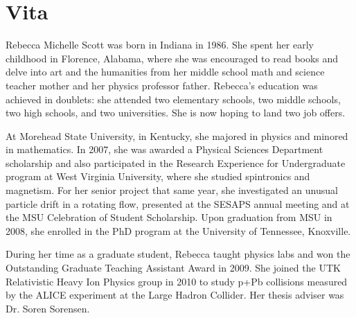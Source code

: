 \chapter*{Vita} \label{ch:vita}

%
%

Rebecca Michelle Scott was born in Indiana in 1986. She spent her early childhood in Florence, Alabama, where she was encouraged to read books and delve into art and the humanities from her middle school math and science teacher mother and her physics professor father. Rebecca's education was achieved in doublets: she attended two elementary schools, two middle schools, two high schools, and two universities. She is now hoping to land two job offers. 

At Morehead State University, in Kentucky, she majored in physics and minored in mathematics. In 2007, she was awarded a Physical Sciences Department scholarship and also participated in the Research Experience for Undergraduate program at West Virginia University, where she studied spintronics and magnetism. For her senior project that same year, she investigated an unusual particle drift in a rotating flow, presented at the SESAPS annual meeting and at the MSU Celebration of Student Scholarship. Upon graduation from MSU in 2008, she enrolled in the PhD program at the University of Tennessee, Knoxville.

During her time as a graduate student, Rebecca taught physics labs and won the Outstanding Graduate Teaching Assistant Award in 2009. She joined the UTK Relativistic Heavy Ion Physics group in 2010 to study p+Pb collisions measured by the ALICE experiment at the Large Hadron Collider. Her thesis adviser was Dr. Soren Sorensen.